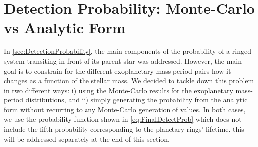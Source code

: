 
\section{Detection Probability: Monte-Carlo vs Analytic Form}\label{sec:AnalyticForm}

In \autoref{sec:DetectionProbability}, the main components of the probability of a ringed-system transiting in front of its parent star was addressed. However, the main goal is to constrain for the different exoplanetary mass-period pairs how it changes as a function of the stellar mass. We decided to tackle down this problem in two different ways: i) using the Monte-Carlo results for the exoplanetary mass-period distributions, and ii) simply generating the probability from the analytic form without recurring to any Monte-Carlo generation of values. In both cases, we use the probability function shown in \autoref{eq:FinalDetectProb} which does not include the fifth probability corresponding to the planetary rings' lifetime. this will be addressed separately at the end of this section.\\

